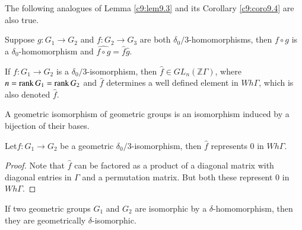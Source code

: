 The following analogues of Lemma \ref{c9:lem9.3} and its Corollary
\ref{c9:coro9.4} are also true.

\begin{lemma}\label{c10:lem10.7}
  Suppose $g: G_1 \to G_2$ and $f: G_2 \to G_3$ are both
  $\delta_0/3$-homomorphisms, then $f \circ g$ is a
  $\delta_0$-homomorphism and $\widehat{f \circ g}= \hat{f} \hat{g}$.
\end{lemma}

\begin{coro}\label{c10:coro10.8}
  If $f : G_1 \to G_2$ is a $\delta_0/3$-isomorphism, then $\hat{f}
  \in GL_n (\mathbb{Z}\Gamma)$, where $n= \operatorname{rank} G_1 = \operatorname{rank} G_2$ and
  $\hat{f}$ determines a well defined element in $Wh\Gamma$, which is
  also denoted $\hat{f}$.
\end{coro}

\begin{defi}\label{c10:defi10.9}
  A geometric isomorphism of geometric groups is an isomorphism
  induced by a bijection of their bases.
\end{defi}

\begin{lemma}\label{c10:lem10.10}
  Let\pageoriginale $f: G_1 \to G_2$ be a geometric
  $\delta_0/3$-isomorphism, then $\hat{f}$ represents 0 in $Wh \Gamma$.
\end{lemma}

\begin{proof}
  Note that $\hat{f}$ can be factored as a product of a diagonal
  matrix with diagonal entries in $\Gamma$ and a permutation
  matrix. But both these represent 0 in $Wh\Gamma$. 
\end{proof}

\begin{lemma}\label{c10:lem10.11}
  If two geometric groups $G_1$ and $G_2$ are isomorphic by a
  $\delta$-homomorphism, then they are geometrically
  $\delta$-isomorphic. 
\end{lemma}

